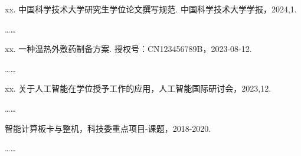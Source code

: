 
\begin{achievements}

  \begin{theachievements}[已发表论文]
    \item xx. 中国科学技术大学研究生学位论文撰写规范. 中国科学技术大学学报，2024,1.
    \item ……
  \end{theachievements}

  \begin{theachievements}[发明专利]
    \item xx. 一种温热外敷药制备方案. 授权号：CN123456789B，2023-08-12.
    \item ……
  \end{theachievements}

  \begin{theachievements}[会议论文]
    \item xx. 关于人工智能在学位授予工作的应用，人工智能国际研讨会，2023,12.
    \item ……
  \end{theachievements}

  \begin{theachievements}[参与的科研项目]
    \item 智能计算板卡与整机，科技委重点项目-课题，2018-2020.
    \item ……
  \end{theachievements}

\end{achievements}
